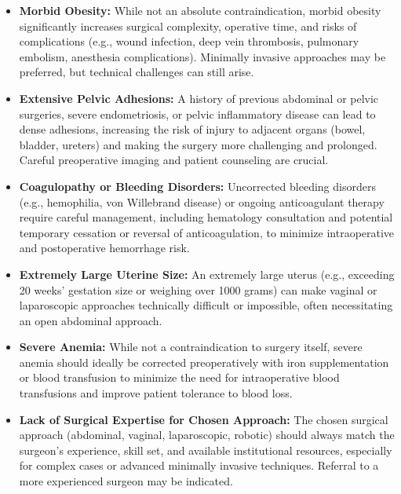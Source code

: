 \begin{itemize}
  \item \textbf{Morbid Obesity:} While not an absolute contraindication, morbid obesity significantly increases surgical complexity, operative time, and risks of complications (e.g., wound infection, deep vein thrombosis, pulmonary embolism, anesthesia complications). Minimally invasive approaches may be preferred, but technical challenges can still arise.

  \item \textbf{Extensive Pelvic Adhesions:} A history of previous abdominal or pelvic surgeries, severe endometriosis, or pelvic inflammatory disease can lead to dense adhesions, increasing the risk of injury to adjacent organs (bowel, bladder, ureters) and making the surgery more challenging and prolonged. Careful preoperative imaging and patient counseling are crucial.

  \item \textbf{Coagulopathy or Bleeding Disorders:} Uncorrected bleeding disorders (e.g., hemophilia, von Willebrand disease) or ongoing anticoagulant therapy require careful management, including hematology consultation and potential temporary cessation or reversal of anticoagulation, to minimize intraoperative and postoperative hemorrhage risk.

  \item \textbf{Extremely Large Uterine Size:} An extremely large uterus (e.g., exceeding 20 weeks' gestation size or weighing over 1000 grams) can make vaginal or laparoscopic approaches technically difficult or impossible, often necessitating an open abdominal approach.

  \item \textbf{Severe Anemia:} While not a contraindication to surgery itself, severe anemia should ideally be corrected preoperatively with iron supplementation or blood transfusion to minimize the need for intraoperative blood transfusions and improve patient tolerance to blood loss.

  \item \textbf{Lack of Surgical Expertise for Chosen Approach:} The chosen surgical approach (abdominal, vaginal, laparoscopic, robotic) should always match the surgeon's experience, skill set, and available institutional resources, especially for complex cases or advanced minimally invasive techniques. Referral to a more experienced surgeon may be indicated.
\end{itemize}

